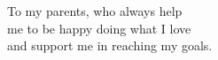 \null
\vspace{2cm}
\begin{flushright}
     To my parents, who always help\\
   me to be happy doing what I love\\
and support me in reaching my goals.
\end{flushright}
\vfill
\cleardoublepage %
\null
\vspace{2cm}
\thispagestyle{empty}